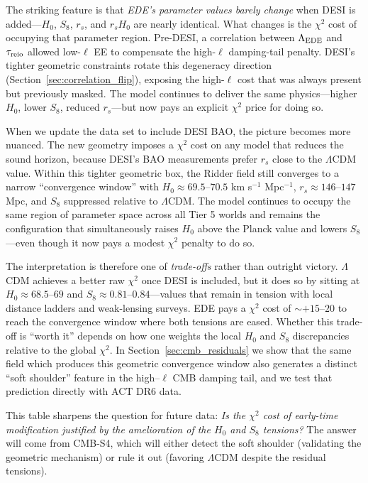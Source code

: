 \documentclass[a4paper,11pt]{article}
\begin{document}
The striking feature is that \emph{EDE's parameter values barely change} when DESI is added---$H_0$, $S_8$, $r_s$, and $r_s H_0$ are nearly identical. What changes is the $\chi^2$ cost of occupying that parameter region. Pre-DESI, a correlation between $\Lambda_{\rm EDE}$ and $\tau_{\rm reio}$ allowed low-$\ell$ EE to compensate the high-$\ell$ damping-tail penalty. DESI's tighter geometric constraints rotate this degeneracy direction (Section~\ref{sec:correlation_flip}), exposing the high-$\ell$ cost that was always present but previously masked. The model continues to deliver the same physics---higher $H_0$, lower $S_8$, reduced $r_s$---but now pays an explicit $\chi^2$ price for doing so.

When we update the data set to include DESI BAO, the picture becomes more nuanced. The new geometry imposes a $\chi^2$ cost on any model that reduces the sound horizon, because DESI's BAO measurements prefer $r_s$ close to the $\Lambda$CDM value. Within this tighter geometric box, the Ridder field still converges to a narrow ``convergence window'' with $H_0 \approx 69.5$--$70.5$ km s$^{-1}$ Mpc$^{-1}$, $r_s \approx 146$--$147$ Mpc, and $S_8$ suppressed relative to $\Lambda$CDM. The model continues to occupy the same region of parameter space across all Tier 5 worlds and remains the configuration that simultaneously raises $H_0$ above the Planck value and lowers $S_8$---even though it now pays a modest $\chi^2$ penalty to do so.

The interpretation is therefore one of \emph{trade-offs} rather than outright victory. $\Lambda$CDM achieves a better raw $\chi^2$ once DESI is included, but it does so by sitting at $H_0 \approx 68.5$--$69$ and $S_8 \approx 0.81$--$0.84$---values that remain in tension with local distance ladders and weak-lensing surveys. EDE pays a $\chi^2$ cost of $\sim +15$--$20$ to reach the convergence window where both tensions are eased. Whether this trade-off is ``worth it'' depends on how one weights the local $H_0$ and $S_8$ discrepancies relative to the global $\chi^2$. In Section~\ref{sec:cmb_residuals} we show that the same field which produces this geometric convergence window also generates a distinct ``soft shoulder'' feature in the high--$\ell$ CMB damping tail, and we test that prediction directly with ACT DR6 data.

This table sharpens the question for future data: \emph{Is the $\chi^2$ cost of early-time modification justified by the amelioration of the $H_0$ and $S_8$ tensions?} The answer will come from CMB-S4, which will either detect the soft shoulder (validating the geometric mechanism) or rule it out (favoring $\Lambda$CDM despite the residual tensions).
\end{document}
